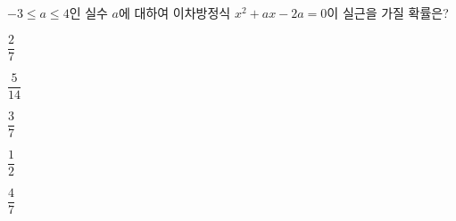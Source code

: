 $-3\le a\le 4$인 실수 $a$에 대하여 이차방정식 $x^2+ax-2a=0$이 실근을 가질 확률은?
\begin{choices32}{\rule[-3ex]{0pt}{8ex}$\dfrac{2}{7}$}{\rule[-3ex]{0pt}{8ex}$\dfrac{5}{14}$}{\rule[-3ex]{0pt}{8ex}$\dfrac{3}{7}$}{\rule[-3ex]{0pt}{8ex}$\dfrac{1}{2}$}{\rule[-3ex]{0pt}{8ex}$\dfrac{4}{7}$}\end{choices32}
